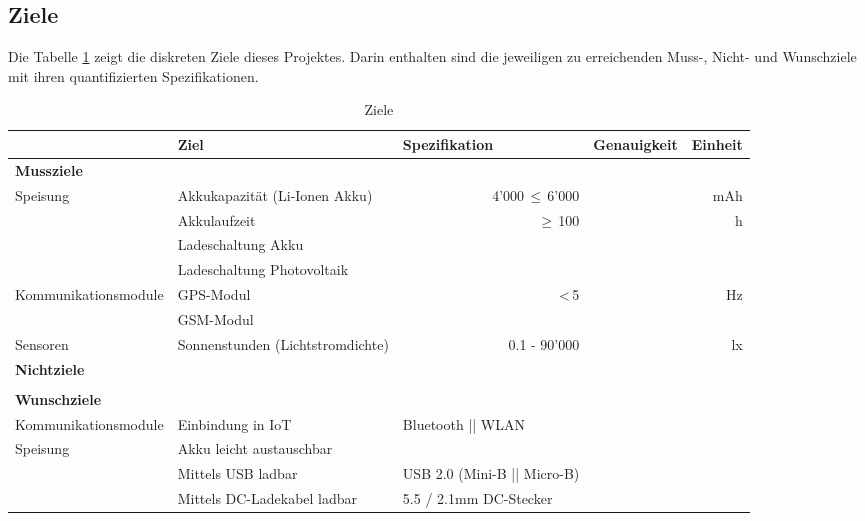 \begin{landscape}
\subsection{Ziele}
Die Tabelle \ref{tab:ZieleP6} zeigt die diskreten Ziele dieses Projektes. Darin enthalten sind die jeweiligen zu erreichenden Muss-, Nicht- und Wunschziele mit ihren quantifizierten Spezifikationen.\\

\begin{table}[htbp]
  \centering
  \renewcommand{\arraystretch}{1.4}
  \caption{Ziele}
    \begin{tabular}{l|l|l|r|r}
          & \textbf{Ziel} & \multicolumn{1}{l|}{\textbf{Spezifikation}} & \multicolumn{1}{l|}{\textbf{Genauigkeit}} & \multicolumn{1}{l}{\textbf{Einheit}} \\
    \toprule
    \multicolumn{1}{l}{\textbf{Mussziele}} & \multicolumn{4}{r}{} \\
    \toprule
    \multirow{4}{*}{Speisung} & Akkukapazität (Li-Ionen Akku) & \multicolumn{1}{r|}{4'000\,$\leq$\,6'000} &  & mAh \\
\cline{2-5}           & Akkulaufzeit & \multicolumn{1}{r|}{$\geq$\,100} &   & h \\
\cline{2-5}          & Ladeschaltung Akku &       &       &  \\
\cline{2-5}           & Ladeschaltung Photovoltaik &       &       &  \\
    \hline
    \multirow{2}{*}{Kommunikationsmodule} & GPS-Modul   &  \multicolumn{1}{r|}{<\,5}  &       & Hz \\
\cline{2-5}          & GSM-Modul  &       &       &  \\
\hline
Sensoren & Sonnenstunden (Lichtstromdichte) & \multicolumn{1}{r|}{0.1 - 90'000} & & lx \\
    \bottomrule
    \multicolumn{1}{l}{\textbf{Nichtziele}} & \multicolumn{4}{r}{} \\
    \toprule
    & & & & \\
    \bottomrule
    \multicolumn{1}{l}{\textbf{Wunschziele}} & \multicolumn{4}{r}{} \\
    \toprule
    Kommunikationsmodule & Einbindung in IoT &       Bluetooth || WLAN &       &  \\
    \hline
    \multirow{3}{*}{Speisung} & Akku leicht austauschbar &       &       &  \\
\cline{2-5}  & Mittels USB ladbar & USB 2.0 (Mini-B || Micro-B) &       &  \\
\cline{2-5}  & Mittels DC-Ladekabel ladbar &      5.5 / 2.1mm DC-Stecker &       &  \\
    \bottomrule
    \end{tabular}%
  \label{tab:ZieleP6}%
\end{table}%


\end{landscape}
